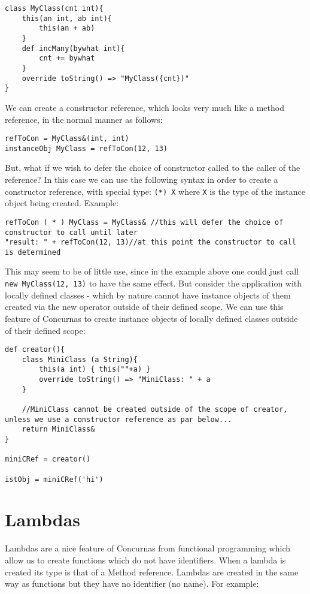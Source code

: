 \documentclass[conc-doc]{subfiles}
\begin{document}
\begin{lstlisting}
class MyClass(cnt int){
	this(an int, ab int){
		this(an + ab)
	}
	def incMany(bywhat int){
		cnt += bywhat
	}
	override toString() => "MyClass({cnt})"
}
\end{lstlisting}

We can create a constructor reference, which looks very much like a method reference, in the normal manner as follows:

\begin{lstlisting}
refToCon = MyClass&(int, int)
instanceObj MyClass = refToCon(12, 13)
\end{lstlisting}

But, what if we wish to defer the choice of constructor called to the caller of the reference? In this case we can use the following syntax in order to create a constructor reference, with special type: \lstinline{(*) X} where \lstinline{X} is the type of the instance object being created. Example:

\begin{lstlisting}
refToCon ( * ) MyClass = MyClass& //this will defer the choice of constructor to call until later
"result: " + refToCon(12, 13)//at this point the constructor to call is determined
\end{lstlisting}

This may seem to be of little use, since in the example above one could just call \lstinline{new MyClass(12, 13)} to have the same effect. But consider the application with locally defined classes - which by nature cannot have instance objects of them created via the new operator outside of their defined scope. We can use this feature of Concurnas to create instance objects of locally defined classes outside of their defined scope:

\begin{lstlisting}
def creator(){
	class MiniClass (a String){
		this(a int) { this(""+a) }
		override toString() => "MiniClass: " + a
	}
	
	//MiniClass cannot be created outside of the scope of creator, unless we use a constructor reference as par below...
	return MiniClass&
}

miniCRef = creator()

istObj = miniCRef('hi')
\end{lstlisting}

\section{Lambdas}
Lambdas are a nice feature of Concurnas from functional programming which allow us to create functions which do not have identifiers. When a lambda is created its type is that of a Method reference. Lambdas are created in the same way as functions but they have no identifier (no name). For example:
\end{document}
